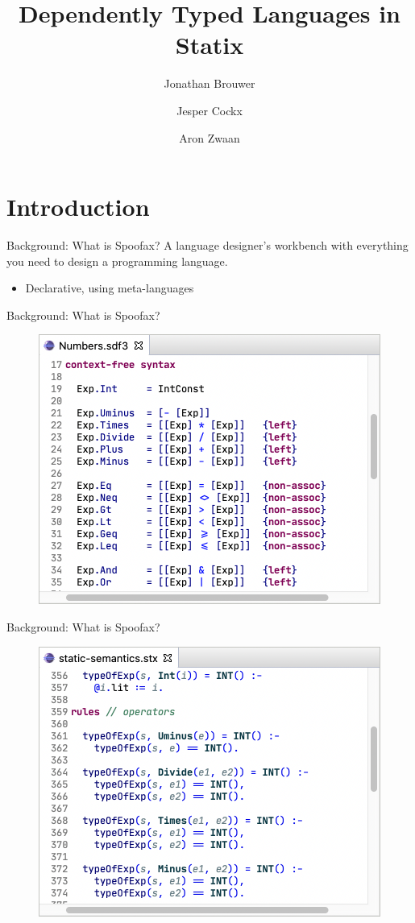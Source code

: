 \documentclass[aspectratio=43]{beamer}
\title[]{Dependently Typed Languages in Statix}
\institute[]{Delft University of Technology, The Netherlands}
\author{Jonathan Brouwer \and Jesper Cockx \and Aron Zwaan}
\begin{document}
\section{Introduction}
{
\frame{\titlepage}
}

\begin{frame}[fragile]{Background: What is Spoofax?}
	A language designer's workbench with everything you need to design a programming language.
	\begin{itemize}
		\item Declarative, using meta-languages
	\end{itemize}
\end{frame}

\begin{frame}[fragile]{Background: What is Spoofax?}
\begin{figure}
	\includegraphics[width=0.8\linewidth]{img/syntax}
\end{figure}
\end{frame}

\begin{frame}[fragile]{Background: What is Spoofax?}
	\begin{figure}
		\includegraphics[width=0.8\linewidth]{img/semantics}
	\end{figure}
\end{frame}
\end{document}
